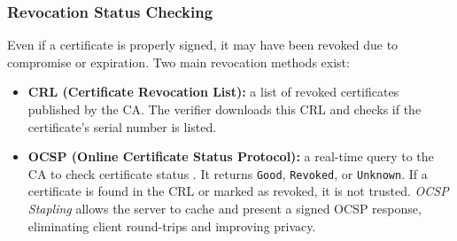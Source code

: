 \documentclass[10pt,twocolumn]{article}
\begin{document}
\subsubsection{Revocation Status Checking}

Even if a certificate is properly signed, it may have been revoked due to
compromise or expiration. Two main revocation methods exist:

\begin{itemize}
  \item \textbf{CRL (Certificate Revocation List):} a list of revoked
        certificates published by the CA. The verifier downloads this CRL and
        checks if the certificate's serial number is listed.
  \item \textbf{OCSP (Online Certificate Status Protocol):} a real-time query
        to the CA to check certificate status \cite{rfc6960}. It returns
        \texttt{Good}, \texttt{Revoked}, or \texttt{Unknown}. If a certificate
        is found in the CRL or marked as revoked, it is not trusted.
        \emph{OCSP Stapling} allows the server to cache and present a signed
        OCSP response, eliminating client round-trips and improving privacy.
\end{itemize}
\end{document}
